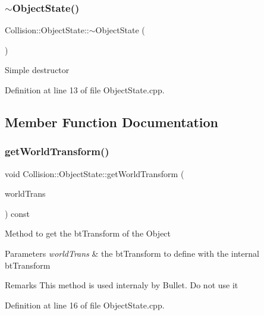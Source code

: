 \subsubsection{\texorpdfstring{$\sim$\+Object\+State()}{~ObjectState()}}
{\footnotesize\ttfamily Collision\+::\+Object\+State\+::$\sim$\+Object\+State (\begin{DoxyParamCaption}{ }\end{DoxyParamCaption})\hspace{0.3cm}{\ttfamily [virtual]}}

Simple destructor 

Definition at line 13 of file Object\+State.\+cpp.



\subsection{Member Function Documentation}
\mbox{\label{class_collision_1_1_object_state_a2bfa06b1f231cad379fbbd6a86cb9ac9}} 
\subsubsection{\texorpdfstring{get\+World\+Transform()}{getWorldTransform()}}
{\footnotesize\ttfamily void Collision\+::\+Object\+State\+::get\+World\+Transform (\begin{DoxyParamCaption}\item[{bt\+Transform \&}]{world\+Trans }\end{DoxyParamCaption}) const\hspace{0.3cm}{\ttfamily [virtual]}}

Method to get the bt\+Transform of the Object 
\begin{DoxyParams}{Parameters}
{\em world\+Trans} & the bt\+Transform to define with the internal bt\+Transform \\
\hline
\end{DoxyParams}
\begin{DoxyRemark}{Remarks}
This method is used internaly by Bullet. Do not use it 
\end{DoxyRemark}


Definition at line 16 of file Object\+State.\+cpp.

